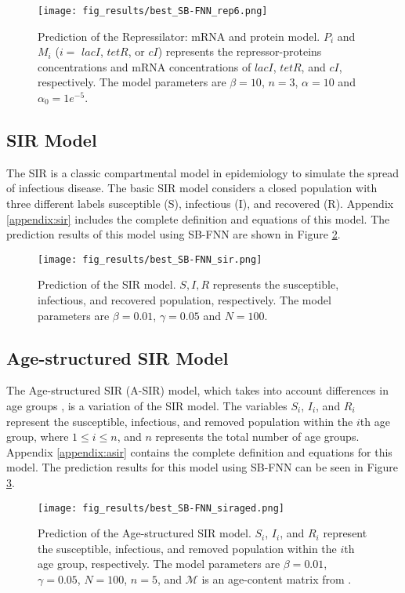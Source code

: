 \begin{figure}[h]
\centering
\texttt{[image: fig\_results/best\_SB-FNN\_rep6.png]}
\caption[Prediction of the Repressilator: mRNA and protein model] {Prediction of the Repressilator: mRNA and protein model. $P_{i}$ and $M_{i}$ ($i=$ $lacI$, $tetR$, or $cI$) represents the repressor-proteins concentrations and mRNA concentrations of $lacI$, $tetR$, and $cI$, respectively. The model parameters are $\beta = 10$, $n=3$, $\alpha=10$ and $\alpha_0=1e^{-5}$.}
\label{fig:rep6_prediction}
\end{figure}

\subsection{SIR Model}
The SIR \cite{anderson1991discussion} is a classic compartmental model in epidemiology to simulate the spread of infectious disease. The basic SIR model considers a closed population with three different labels susceptible (S), infectious (I), and recovered (R). Appendix \ref{appendix:sir} includes the complete definition and equations of this model. The prediction results of this model using SB-FNN are shown in Figure \ref{fig:sir_prediction}.

\begin{figure}[h]
\centering
\texttt{[image: fig\_results/best\_SB-FNN\_sir.png]}
\caption[Prediction of the SIR model] {Prediction of the SIR model. $S,I,R$ represents the susceptible, infectious, and recovered population, respectively. The model parameters are $\beta = 0.01$, $\gamma=0.05$ and $N=100$.}
\label{fig:sir_prediction}
\end{figure}

\subsection{Age-structured SIR Model}
The Age-structured SIR (A-SIR) model, which takes into account differences in age groups \cite{ram2021modified}, is a variation of the SIR model. The variables $S_i$, $I_i$, and $R_i$ represent the susceptible, infectious, and removed population within the $i$th age group, where $1\leq i \leq n$, and $n$ represents the total number of age groups. Appendix \ref{appendix:asir} contains the complete definition and equations for this model. The prediction results for this model using SB-FNN can be seen in Figure \ref{fig:asir_prediction}.

\begin{figure}[h]
\centering
\texttt{[image: fig\_results/best\_SB-FNN\_siraged.png]}
\caption[Prediction of the Age-structured SIR model] {Prediction of the Age-structured SIR model. $S_i$, $I_i$, and $R_i$ represent the susceptible, infectious, and removed population within the $i$th age group, respectively. The model parameters are $\beta = 0.01$, $\gamma=0.05$, $N=100$, $n=5$, and $\mathcal{M}$ is an age-content matrix from \cite{ram2021modified}.}
\label{fig:asir_prediction}
\end{figure}

